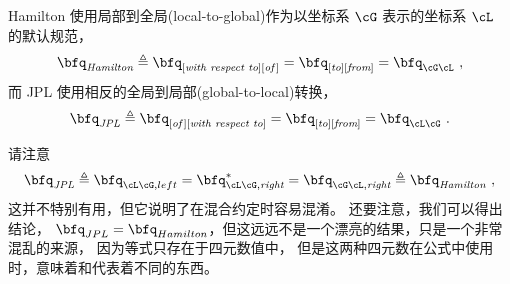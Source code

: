 Hamilton 使用局部到全局(local-to-global)作为以坐标系 $\cG$ 表示的坐标系 $\cL$ 的默认规范， 
%
\begin{align}
\bfq_{\textit{Hamilton}} \triangleq \bfq_{[\textit{with~respect~to}][\textit{of\,}]}=\bfq_{[\textit{to}][\textit{from}]}=\bfq_{\cG\cL}~, 
\end{align}
%
而 JPL 使用相反的全局到局部(global-to-local)转换，
%
\begin{align}
\bfq_{\textit{JPL}} \triangleq \bfq_{[\textit{of}\,][\textit{with~respect~to}]}=\bfq_{[\textit{to}][\textit{from}]}=\bfq_{\cL\cG}~.
\end{align}

请注意
%
\begin{align}
\bfq_{\textit{JPL}}
\triangleq    \bfq_{\cL\cG,left}
=    \bfq_{\cL\cG,\textit{right}}^*
=    \bfq_{\cG\cL,\textit{right}}
\triangleq    \bfq_{\textit{Hamilton}}%
~,
\label{equ:quatEquivalences}
\end{align}
%
这并不特别有用，但它说明了在混合约定时容易混淆。
还要注意，我们可以得出结论， $\bfq_{JPL} = \bfq_{Hamilton}$，但这远远不是一个漂亮的结果，只是一个非常混乱的来源， 
因为等式只存在于四元数值中， 
但是这两种四元数在公式中使用时，意味着和代表着不同的东西。




